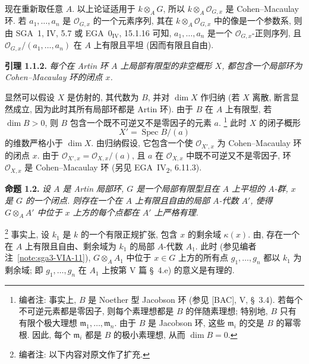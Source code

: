 现在重新取任意 \(A\).
以上论证适用于 \(k\otimes_A G\),
所以 \(k\otimes_A\mathcal O_{G,x}\) 是 Cohen--Macaulay 环.
若 \(a_1,\ldots,a_n\) 是 \(\mathcal O_{G,x}\) 的一个元素序列,
其在 \(k\otimes_A\mathcal O_{G,x}\) 中的像是一个参数系,
则由 SGA~1, IV, 5.7 或 EGA~\(0_{\mathrm{IV}}\), 15.1.16 可知,
\(a_1,\ldots,a_n\) 是一个 \(\mathcal O_{G,x}\)-正则序列,
且 \(\mathcal O_{G,x}/(a_1,\ldots,a_n)\) 在 \(A\)
上有限且平坦 (因而有限且自由).

\medskip
{}\label{lem:sga3-VIA-1.1.2}%
\noindent\textbf{引理 1.1.2.}
\textit{每个在 Artin 环 \(A\) 上局部有限型的非空概形 \(X\),
都包含一个局部环为 Cohen--Macaulay 环的闭点 \(x\).}

\medskip
显然可以假设 \(X\) 是仿射的, 其代数为 \(B\),
并对 \(\dim X\) 作归纳 (若 \(X\) 离散, 断言显然成立,
因为此时其所有局部环都是 Artin 环).
由于 \(B\) 在 \(A\) 上有限型, 若 \(\dim B>0\),
则 \(B\) 包含一个既不可逆又不是零因子的元素 \(a\).%
\footnote{\label{note:sga3-VIA-12}编者注: 事实上,
\(B\) 是 Noether 型 Jacobson 环 (参见 \textup{[BAC]}, V, \S~3.4).
若每个不可逆元素都是零因子, 则每个素理想都是 \(B\) 的伴随素理想;
特别地, \(B\) 只有有限个极大理想 \(\mathfrak m_1,\ldots,\mathfrak m_n\).
由于 \(B\) 是 Jacobson 环, 这些 \(\mathfrak m_i\) 的交是 \(B\) 的幂零根.
因此, 每个 \(\mathfrak m_i\) 都是 \(B\) 的极小素理想,
从而 \(\dim B=0\).}
此时 \(X\) 的闭子概形
\[
  X'=\operatorname{Spec} B/(a)
\]
的维数严格小于 \(\dim X\).
由归纳假设, 它包含一个使 \(\mathcal O_{X',x}\)
为 Cohen--Macaulay 环的闭点 \(x\).
由于 \(\mathcal O_{X',x}=\mathcal O_{X,x}/(a)\),
且 \(a\) 在 \(\mathcal O_{X,x}\) 中既不可逆又不是零因子,
环 \(\mathcal O_{X,x}\) 是 Cohen--Macaulay 环
(另见 EGA~IV\textsubscript{2}, 6.11.3).

\medskip
{}\label{prop:sga3-VIA-1.2}%
\noindent\textbf{命题 1.2.}
\textit{设 \(A\) 是 Artin 局部环,
\(G\) 是一个局部有限型且在 \(A\) 上平坦的 \(A\)-群,
\(x\) 是 \(G\) 的一个闭点.
则存在一个在 \(A\) 上有限且自由的局部 \(A\)-代数 \(A'\),
使得 \(G\otimes_A A'\) 中位于 \(x\) 上方的每个点都在 \(A'\) 上严格有理.}

\medskip
\noindent\footnote{\label{note:sga3-VIA-13}编者注: 以下内容对原文作了扩充.}
事实上, 设 \(k_1\) 是 \(k\) 的一个有限正规扩张,
包含 \(x\) 的剩余域 \(\kappa(x)\).
由,
存在一个在 \(A\) 上有限且自由、剩余域为 \(k_1\) 的局部 \(A\)-代数 \(A_1\).
此时 (参见编者注~\ref{note:sga3-VIA-11}),
\(G\otimes_A A_1\) 中位于 \(x\in G\) 上方的所有点
\(g_1,\ldots,g_n\) 都以 \(k_1\) 为剩余域;
即 \(g_1,\ldots,g_n\) 在 \(A_1\) 上按第 V 篇 \S~4.e) 的意义是有理的.

